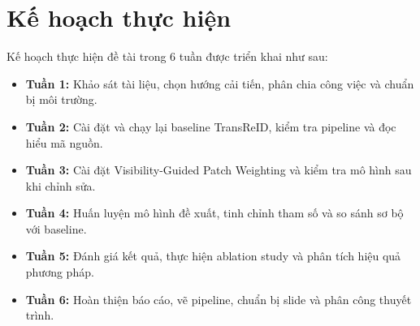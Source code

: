 \vspace{-6pt}
\section{Kế hoạch thực hiện}

Kế hoạch thực hiện đề tài trong 6 tuần được triển khai như sau:

\begin{itemize}
    \item \textbf{Tuần 1:} Khảo sát tài liệu, chọn hướng cải tiến, phân chia công việc và chuẩn bị môi trường.
    \item \textbf{Tuần 2:} Cài đặt và chạy lại baseline TransReID, kiểm tra pipeline và đọc hiểu mã nguồn.
    \item \textbf{Tuần 3:} Cài đặt Visibility-Guided Patch Weighting và kiểm tra mô hình sau khi chỉnh sửa.
    \item \textbf{Tuần 4:} Huấn luyện mô hình đề xuất, tinh chỉnh tham số và so sánh sơ bộ với baseline.
    \item \textbf{Tuần 5:} Đánh giá kết quả, thực hiện ablation study và phân tích hiệu quả phương pháp.
    \item \textbf{Tuần 6:} Hoàn thiện báo cáo, vẽ pipeline, chuẩn bị slide và phân công thuyết trình.
\end{itemize}
